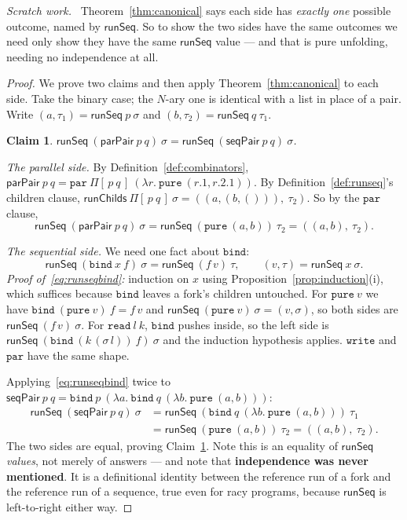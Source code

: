 \documentclass[11pt,a4paper]{article}
\theoremstyle{definition}
\theoremstyle{plain}
\newtheorem{claim}[definition]{Claim}
\theoremstyle{remark}
\newenvironment{scratch}{\par\medskip\noindent\textit{Scratch work.}\ \ignorespaces}{\par\medskip}
\newcommand{\st}{\sigma}
\newcommand{\runSeq}{\mathsf{runSeq}}
\begin{document}
\begin{scratch}
Theorem~\ref{thm:canonical} says each side has \emph{exactly one} possible outcome, named by
$\runSeq$. So to show the two sides have the same outcomes we need only show they have the
same $\runSeq$ value --- and that is pure unfolding, needing no independence at all.
\end{scratch}

\begin{proof}
We prove two claims and then apply Theorem~\ref{thm:canonical} to each side. Take the binary
case; the $N$-ary one is identical with a list in place of a pair. Write
$(a,\tau_1) = \runSeq\ p\ \st$ and $(b,\tau_2) = \runSeq\ q\ \tau_1$.

\begin{claim}\label{cl:samerunseq}
$\runSeq\ (\mathsf{parPair}\ p\ q)\ \st = \runSeq\ (\mathsf{seqPair}\ p\ q)\ \st$.
\end{claim}

\emph{The parallel side.} By Definition~\ref{def:combinators},
$\mathsf{parPair}\ p\ q = \texttt{par}\ \Pi[\,p\ q\,]\ (\lambda r.\ \texttt{pure}\ (r.1, r.2.1))$.
By Definition~\ref{def:runseq}'s children clause,
$\mathsf{runChilds}\ \Pi[\,p\ q\,]\ \st = ((a, (b, ())),\ \tau_2)$. So by the $\texttt{par}$
clause,
\[
  \runSeq\ (\mathsf{parPair}\ p\ q)\ \st = \runSeq\ (\texttt{pure}\ (a,b))\ \tau_2 = ((a,b),\ \tau_2) .
\]

\emph{The sequential side.} We need one fact about $\texttt{bind}$:
\begin{equation}
  \runSeq\ (\texttt{bind}\ x\ f)\ \st = \runSeq\ (f\,v)\ \tau, \qquad (v,\tau) = \runSeq\ x\ \st . \label{eq:runseqbind}
\end{equation}
\emph{Proof of~\eqref{eq:runseqbind}:} induction on $x$ using
Proposition~\ref{prop:induction}(i), which suffices because $\texttt{bind}$ leaves a fork's
children untouched. For $\texttt{pure}\ v$ we have $\texttt{bind}\ (\texttt{pure}\ v)\ f = f\,v$
and $\runSeq\ (\texttt{pure}\ v)\ \st = (v,\st)$, so both sides are $\runSeq\ (f\,v)\ \st$. For
$\texttt{read}\ l\ k$, $\texttt{bind}$ pushes inside, so the left side is
$\runSeq\ (\texttt{bind}\ (k\,(\st\,l))\ f)\ \st$ and the induction hypothesis applies.
$\texttt{write}$ and $\texttt{par}$ have the same shape.

Applying~\eqref{eq:runseqbind} twice to
$\mathsf{seqPair}\ p\ q = \texttt{bind}\ p\ (\lambda a.\ \texttt{bind}\ q\ (\lambda b.\ \texttt{pure}\ (a,b)))$:
\begin{align*}
  \runSeq\ (\mathsf{seqPair}\ p\ q)\ \st
  &= \runSeq\ (\texttt{bind}\ q\ (\lambda b.\ \texttt{pure}\ (a,b)))\ \tau_1 \\
  &= \runSeq\ (\texttt{pure}\ (a,b))\ \tau_2
   = ((a,b),\ \tau_2) .
\end{align*}
The two sides are equal, proving Claim~\ref{cl:samerunseq}. Note this is an equality of
$\runSeq$ \emph{values}, not merely of answers --- and note that \textbf{independence was
never mentioned}. It is a definitional identity between the reference run of a fork and the
reference run of a sequence, true even for racy programs, because $\runSeq$ is left-to-right
either way.


\end{proof}
\end{document}
